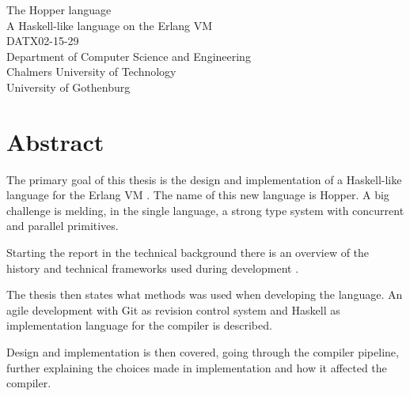 The Hopper language\\
A Haskell-like language on the Erlang VM\\
DATX02-15-29\\
Department of Computer Science and Engineering\\
Chalmers University of Technology\\
University of Gothenburg\\

\thispagestyle{plain}			%
\section*{Abstract}





The primary goal of this thesis is the design and implementation of a Haskell-like language for the Erlang VM . The name of this new language is Hopper. A big challenge is melding, in the single language, a strong type system with concurrent and parallel primitives.

Starting the report in the technical background there is an overview of the history and technical frameworks used during development . %

The thesis then states what methods was used when developing the language. An agile development with Git as revision control system and Haskell as implementation language for the compiler is described. 

Design and implementation is then covered, going through the compiler pipeline, further explaining the choices made in implementation and how it affected the compiler.

